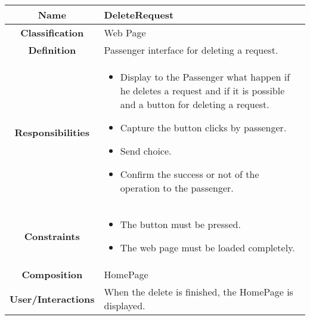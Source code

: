 \documentclass[11pt, a4paper,titlepage]{article}
\begin{document}
\begin{enumerate}
\begin{tabularx}{\textwidth}{| c | X |}
	\\
	\hline	
\end{tabularx}

\begin{tabularx}{\textwidth}{| c | X |}
	\hline
	\textbf{Name} & 
	DeleteRequest
	\\
	\hline
	\textbf{Classification} & 
	Web Page
	\\
	\hline
	\textbf{Definition} & 
     Passenger interface for deleting a request.
	\\
	\hline
	\textbf{Responsibilities} &
	\begin{itemize}
		\item Display to the Passenger what happen if he deletes a request and if it is possible and a button for deleting a request.
		\item Capture the button clicks by passenger.    
		\item Send choice.
		\item Confirm the success or not of the operation to the passenger.
	\end{itemize}
	\\
	\hline
	\textbf{Constraints} & 
		\begin{itemize}
		\item The button must be pressed.
		\item The web page must be loaded completely.
		\end{itemize}	
	\\
	\hline
	\textbf{Composition} &  HomePage
	\\
	\hline
	\textbf{User/Interactions} & 
	When the delete is finished, the HomePage is displayed.
	\\
	\hline	
\end{tabularx}


\end{enumerate}
\end{document}
